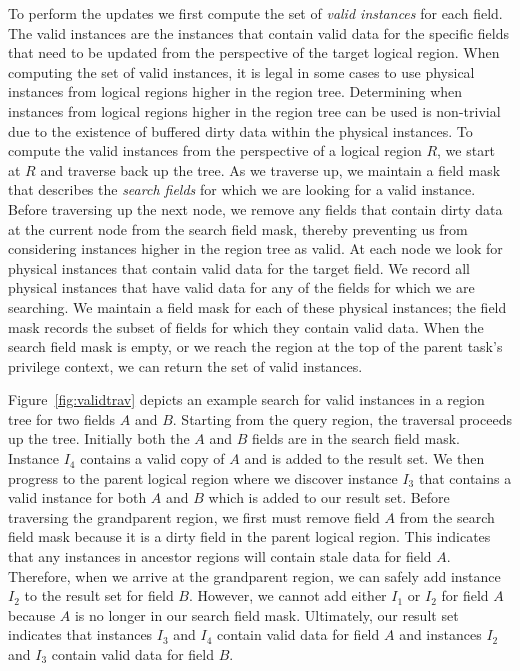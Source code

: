 To perform the updates we first compute the
set of {\em valid instances} for each field. The
valid instances are the instances that contain
valid data for the specific fields that 
need to be updated from the perspective of the
target logical region. When computing the set of
valid instances, it is legal in some cases to
use physical instances from logical regions
higher in the region tree. Determining when 
instances from logical regions higher in the
region tree can be used is non-trivial due to
the existence of buffered dirty data within
the physical instances. To compute the valid 
instances from the perspective of a logical
region $R$, we start at $R$ and traverse
back up the tree.  As we traverse up, we maintain
a field mask that describes the {\em search fields} for 
which we are looking for a valid instance. Before 
traversing up the next node, we remove any fields 
that contain dirty data at the current node from the 
search field mask, thereby preventing us from considering 
instances higher in the region tree as valid. At each
node we look for physical instances that contain
valid data for the target field.  We record all
physical instances that have valid data for any
of the fields for which we are searching.  We 
maintain a field mask for each of these physical
instances; the field mask records the subset of fields for
which they contain valid data.  When the search field
mask is empty, or we reach the region at the top
of the parent task's privilege context, we can
return the set of valid instances.

Figure~\ref{fig:validtrav} depicts an example search
for valid instances in a region tree for two fields
$A$ and $B$. Starting from the query region,
the traversal proceeds up the tree. Initially both
the $A$ and $B$ fields are in the search field mask. 
Instance $I_4$ contains a valid copy of $A$ and is
added to the result set. We then progress to the 
parent logical region where we discover instance
$I_3$ that contains a valid instance for both $A$
and $B$ which is added to our result set. Before
traversing the grandparent region, we first must
remove field $A$ from the search field mask because it
is a dirty field in the parent logical region. This
indicates that any instances in ancestor regions will
contain stale data for field $A$. Therefore, when we
arrive at the grandparent region, we can safely add
instance $I_2$ to the result set for field $B$. 
However, we cannot add either $I_1$ or $I_2$ for 
field $A$ because $A$ is no longer in our search
field mask. Ultimately, our result set indicates that
instances $I_3$ and $I_4$ contain valid data for
field $A$ and instances $I_2$ and $I_3$ contain
valid data for field $B$.

